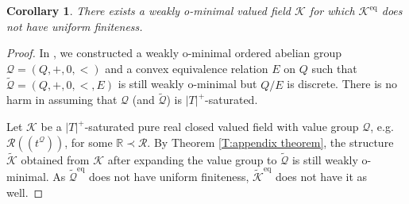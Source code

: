 \documentclass[11pt]{amsart}
\DeclareMathOperator{\eq}{eq}
\newtheorem{corollary}[theorem]{Corollary}
\theoremstyle{definition}
\newcommand{\CK}{{\mathcal K}}
\newcommand{\0}{\emptyset}
\begin{document}
    
    \begin{corollary}
        There exists a weakly o-minimal valued field $\CK$ for which $\CK^{\eq}$ does not have uniform finiteness.
    \end{corollary}
    \begin{proof}
        In \cite[Example A.6]{HaHaPeSs}, we constructed a weakly o-minimal ordered abelian group $\mathcal{Q}=(Q,+,0,<)$ and a convex equivalence relation $E$ on $Q$ such that $\widetilde{\mathcal{Q}}=(Q,+,0,<,E)$ is still weakly o-minimal but $Q/E$ is discrete. There is no harm in assuming that $\mathcal{Q}$ (and $\widetilde{\mathcal{Q}}$) is $|T|^+$-saturated.
    
        Let $\CK$ be a $|T|^+$-saturated pure real closed valued field with value group $\mathcal{Q}$, e.g. $\mathcal{R}((t^{\mathcal{Q}}))$, for some $\mathbb{R}\prec \mathcal{R}$. By Theorem \ref{T:appendix theorem}, the structure $\widetilde{\mathcal{K}}$ obtained from $\mathcal{K}$ after expanding the value group to $\widetilde{\mathcal{Q}}$ is still weakly o-minimal. As $\widetilde{\mathcal{Q}}^{\eq}$ does not have uniform finiteness, $\widetilde{\mathcal{K}}^{\eq}$ does not have it as well.
    \end{proof}
    


\end{document}
